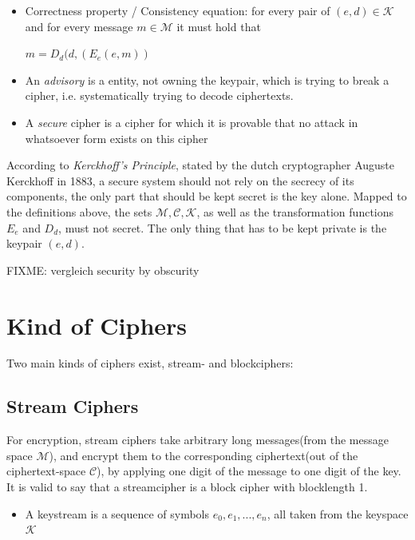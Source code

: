 \begin{itemize}
\begin{center}
 \end{center}

 \item Correctness property / Consistency equation: for every pair of $(e,d) \in \mathcal{K}$ and for every message $m \in \mathcal{M}$ it must hold that 
 \begin{center}  
 $ m = D_d(d, (E_e(e, m))$
  \end{center}
  
 \item An \textit{advisory} is a entity, not owning the keypair, which is trying to break a cipher, i.e. systematically trying to decode ciphertexts.  
 \item A \textit{secure} cipher is a cipher for which it is provable that no attack in whatsoever form exists on this cipher 
\end{itemize}

According to \textit{Kerckhoff's Principle}, stated by the dutch cryptographer Auguste Kerckhoff in 1883, a secure system should not rely on the secrecy of
its components, the only part that should be kept secret is the key alone. Mapped to the definitions above, the sets $\mathcal{M, C, K}$, as well as the
transformation functions $E_e$ and $D_d$, must not secret. The only thing that has to be kept private is the keypair $(e, d)$.

FIXME: vergleich security by obscurity

\section{Kind of Ciphers}

Two main kinds of ciphers exist, stream- and blockciphers:

\subsection{Stream Ciphers}

For encryption, stream ciphers take arbitrary long messages(from the message space $\mathcal{M}$), and encrypt
them to the corresponding ciphertext(out of the ciphertext-space $\mathcal{C}$), by applying
one digit of the message to one digit of the key. It is valid to say that a streamcipher is a block cipher with blocklength 1.

\begin{itemize}
 \item A keystream is a sequence of symbols $e_0, e_1, ..., e_n$, all taken from the keyspace $\mathcal{K}$
\end{itemize}

